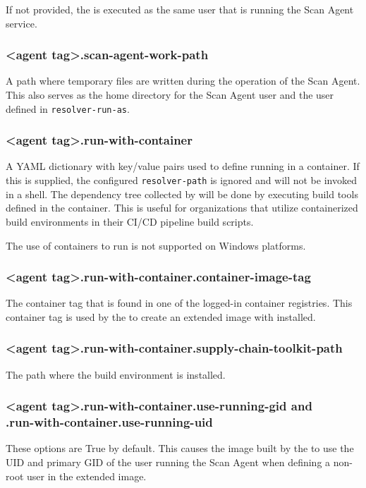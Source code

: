 If not provided, the \scaresolver is executed as the same user that is running the Scan Agent service.

\subsubsection{<agent tag>.scan-agent-work-path}\label{sec:scan-agent-work-path}
A path where temporary files are written during the operation of the Scan Agent.  This also serves as the home
directory for the Scan Agent user and the user defined in \texttt{resolver-run-as}.

\subsubsection{<agent tag>.run-with-container}\label{sec:agent-run-with-container}
A YAML dictionary with key/value pairs used to define running \scaresolver in a container.  If this is supplied,
the configured \texttt{resolver-path} is ignored and \scaresolver will not be invoked in a shell.  The dependency
tree collected by \scaresolver will be done by executing build tools defined in the container.  This is useful for
organizations that utilize containerized build environments in their CI/CD pipeline build scripts.

The use of containers to run \scaresolver is not supported on Windows platforms.

\subsubsection{<agent tag>.run-with-container.container-image-tag}\label{sec:agent-container-image-tag}
The container tag that is found in one of the logged-in container registries.  This container tag is used by the \toolkit
to create an extended image with \scaresolver installed.

\subsubsection{<agent tag>.run-with-container.supply-chain-toolkit-path}\label{sec:agent-supply-chain-toolkit-path}
The path where the \toolkit build environment is installed.

\subsubsection{<agent tag>.run-with-container.use-running-gid and\\<agent tag>.run-with-container.use-running-uid}\label{sec:agent-use-running}
These options are True by default.  This causes the image built by the \toolkit to use the
UID and primary GID of the user running the Scan Agent when defining a non-root
user in the extended image.  

